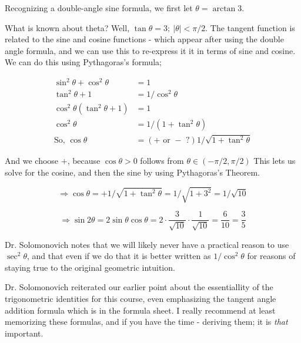 \documentclass{article}
\begin{document}
\vspace{10pt}

Recognizing a double-angle sine formula, we first let $\theta=\arctan3$.

\vspace{10pt}

What is known about theta? Well, $\tan\theta=3;\ |\theta|<\pi/2$. The tangent function is related to the sine and cosine functions - which appear after using the double angle formula, and we can use this to re-express it it in terms of sine and cosine. We can do this using Pythagoras's formula;

\begin{align*}
\sin^2\theta+\cos^2\theta&=1\\
\tan^2\theta+1&=1/\cos^2\theta\\
\cos^2\theta(\tan^2\theta+1)&=1\\
\cos^2\theta&=1/(1+\tan^2\theta)\\
\mbox{So, }\cos\theta&=(+\mbox{ or }-\mbox{ ?})1/\sqrt{1+\tan^2\theta}
\end{align*}

\vspace{10pt}

And we choose $+$, because $\cos\theta>0$ follows from $\theta\in(-\pi/2,\pi/2)$ This lets us solve for the cosine, and then the sine  by using Pythagoras's Theorem.

\[\Rightarrow\cos\theta=+1/\sqrt{1+\tan^2\theta}=1/\sqrt{1+3^2}=1/\sqrt{10}\]

\[\Rightarrow\sin2\theta=2\sin\theta\cos\theta=2\cdot\frac{3}{\sqrt{10}}\cdot\frac{1}{\sqrt{10}}=\frac{6}{10}=\frac{3}{5}\]

\vspace{10pt}

Dr. Solomonovich notes that we will likely never have a practical reason to use $\sec^2\theta$, and that even if we do that it is better written as $1/\cos^2\theta$ for reasons of staying true to the original geometric intuition.

\vspace{10pt}

Dr. Solomonovich reiterated our earlier point about the essentiallity of the trigonometric identities for this course, even emphasizing the tangent angle addition formula which is in the formula sheet. I really recommend at least memorizing these formulas, and if you have the time - deriving them; it is \textit{that} important.

\vspace{10pt}
\end{document}
